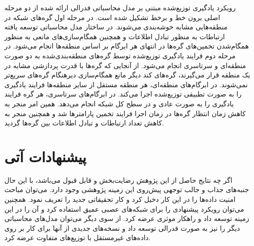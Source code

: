 رویکرد یادگیری توزیع‌شده مبتنی بر مدل محاسباتی  فدرالی ارائه شده از دو مرحله اصلی برون خط و برخط تشکیل شده است. در مرحله اول گره‌های شبکه در منطقه‌هایی مشابه خوشه‌بندی می‌شوند. در ساختار مدل محاسباتی توسعه یافته ارتباطات به منظور تبادل اطلاعات و همچنین همگام‌سازی‌های مانعی به منظور همگام‌شدن تخمین‌های گره‌ها در انتهای هر ابرگام بر اساس منطقه‌ها انجام می‌شود. در مرحله دوم فرایند یادگیری توزیع‌شده توسط گره‌های منطقه‌بندی‌شده به دو صورت منطقه‌ای و سرتاسری انجام می‌شود. از آنجایی که گره‌ها با قدرت پردازشی مشابه در یک منطقه قرار می‌گیرند، گره‌های کند دیگر مانع همگام‌سازی دیرهنگام گره‌های سریع‌تر نمی‌شوند. در ابرگام‌های منطقه‌ای، هر منطقه مستقل از سایر منطقه‌ها فرایند یادگیری را به صورت تطبیقی توزیع‌شده اجرا می‌کند. در ابرگام‌های سرتاسری، هر گره فرایند یادگیری را به صورت عادی و در سطح کل شبکه انجام می‌دهد. همین امر منجر به کاهش زمان انتظار گره‌ها در زمان اجرا فرایند تخمین پارامترها شد و همچنین منجر به کاهش تعداد ارتباطات و تبادل اطلاعات بین گره‌ها گردید. 

\section{پیشنهادات آتی}
اگر چه نتایج حاصل از این پژوهش رضایت‌بخش و قابل قبول می‌باشد، با این حال جنبه‌های جذاب و جالب توجهی پیش‌روی این زمینه پژوهشی وجود دارد. می‌توان مباحث امنیت داده‌ها را در این کار دخیل کرد و کار تحقیقاتی جدید را تعریف نمود. همچنین می‌توان رویکرد پیشنهادی را برای شبکه‌های عصبی عمیق استفاده کرد و آن را در این زمینه توسعه داد و راهکار موثری عرضه کرد. از سوی دیگر می‌توان مدل‌های محاسباتی دیگر را نیز به صورت فدرالی توسعه داد و نسخه‌های جدیدی از آنها برای کار بر روی داده‌های غیرمستقل با توزیع‌های متفاوت عرضه کرد.

